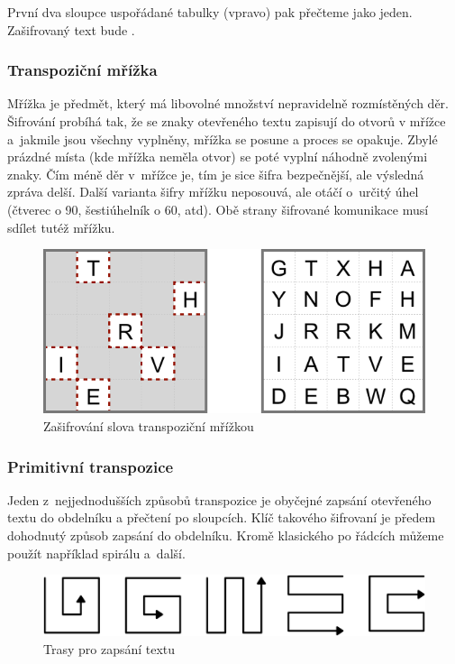 \documentclass[glossaries, index]{kidiplom}
\begin{document}
První dva sloupce uspořádané tabulky (vpravo) pak přečteme jako jeden. Zašifrovaný text bude .

\subsubsection{Transpoziční mřížka}
Mřížka je předmět, který má libovolné množství nepravidelně rozmístěných děr. Šifrování probíhá tak, že se znaky otevřeného textu zapisují do otvorů v mřížce a~jakmile jsou všechny vyplněny, mřížka se posune a proces se opakuje. Zbylé prázdné místa (kde mřížka neměla otvor) se poté vyplní náhodně zvolenými znaky. Čím méně děr v~mřížce je, tím je sice šifra bezpečnější, ale výsledná zpráva delší. Další varianta šifry mřížku neposouvá, ale otáčí o~určitý úhel (čtverec o 90\degree , šestiúhelník o 60\degree , atd). Obě strany šifrované komunikace musí sdílet tutéž mřížku. 

\begin{figure}[htbp]
\centering
\includegraphics[scale=0.4]{graphics/transposition_table.png}
\caption{Zašifrování slova transpoziční mřížkou}
\label{transposition-table}
\end{figure}

\subsubsection{Primitivní transpozice}
Jeden z~nejjednodušších způsobů transpozice je obyčejné zapsání otevřeného textu do obdelníku a přečtení po sloupcích. Klíč takového šifrovaní je předem dohodnutý způsob zapsání do obdelníku. Kromě klasického po řádcích můžeme použít například spirálu a~další.

\begin{figure}[htbp]
\centering
\includegraphics[scale=0.2]{graphics/routes.png}
\caption{Trasy pro zapsání textu}
\label{transposition-routes}
\end{figure}
\end{document}
